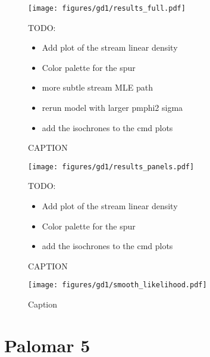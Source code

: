 \documentclass[twocolumn]{aastex631}
\begin{document}
        \begin{figure*}[h]
            \centering
            \texttt{[image: figures/gd1/results\_full.pdf]}
            \caption{CAPTION}
            \label{fig:gd1-results-full}
            TODO:
            \begin{itemize}
                \item Add plot of the stream linear density
                \item Color palette for the spur
                \item more subtle stream MLE path
                \item rerun model with larger pmphi2 sigma
                \item add the isochrones to the cmd plots
            \end{itemize}
        \end{figure*}

        \begin{figure*}[h]
            \centering
            \texttt{[image: figures/gd1/results\_panels.pdf]}
            \caption{CAPTION}
            TODO:
            \begin{itemize}
                \item Add plot of the stream linear density
                \item Color palette for the spur
                \item add the isochrones to the cmd plots
            \end{itemize}
            \label{fig:gd1-results-panels}
        \end{figure*}

        \begin{figure*}
            \centering
            \texttt{[image: figures/gd1/smooth\_likelihood.pdf]}
            \caption{Caption}
            \label{fig:gd1-heatmap}
        \end{figure*}




\clearpage
\section{Palomar 5} \label{sec:results_pal5}
\end{document}
